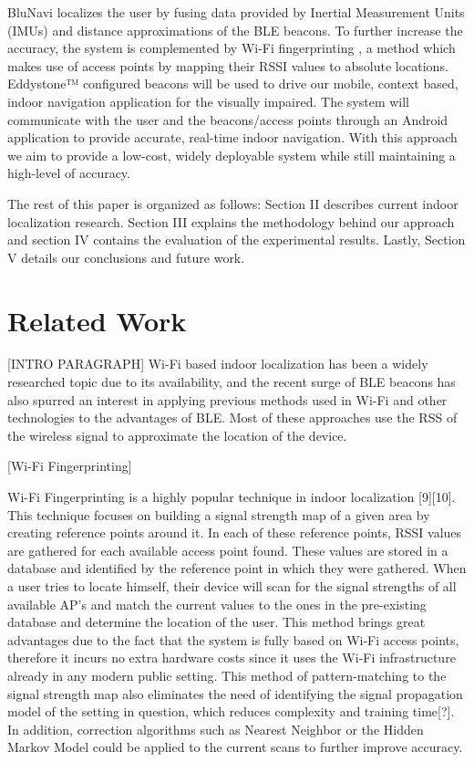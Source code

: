 \documentclass[conference]{IEEEtran}
\begin{document}
BluNavi localizes the user by fusing data provided by Inertial Measurement Units (IMUs) and distance approximations of the BLE beacons. To further increase the accuracy, the system is complemented by Wi-Fi fingerprinting , a method which makes use of access points by mapping their RSSI values to absolute locations. Eddystone™ configured beacons will be used to drive our mobile, context based, indoor navigation application for the visually impaired. The system will communicate with the user and the beacons/access points through an Android application to provide accurate, real-time indoor navigation. With this approach we aim to provide a low-cost, widely deployable system while still maintaining  a high-level of accuracy.

The rest of this paper is organized as follows: Section II describes current indoor localization research. Section III explains the methodology behind our approach and section IV contains the evaluation of the experimental results. Lastly, Section V details our conclusions and future work.

\section{Related Work}
[INTRO PARAGRAPH]
Wi-Fi based indoor localization has been a widely researched topic due to its availability, and the recent surge of BLE beacons has also spurred an interest in applying previous methods used in Wi-Fi and other technologies to the advantages of BLE. Most of these approaches use the RSS of the wireless signal to approximate the location of the device.

[Wi-Fi Fingerprinting]

Wi-Fi Fingerprinting is a highly popular technique in indoor localization [9][10]. This technique focuses on  building a signal strength map of a given area by creating reference points around it. In each of these reference points, RSSI values are gathered for each available access point found. These values are stored in a database and identified by the reference point in which they were gathered. When a user tries to locate himself, their device will scan for the signal strengths of all available AP’s and match the current values to the ones in the pre-existing database and determine the location of the user. This method brings great advantages due to the fact that the system is fully based on Wi-Fi access points, therefore it incurs no extra hardware costs since it uses the Wi-Fi infrastructure already in any modern public setting. This method of pattern-matching to the signal strength map also eliminates the need of identifying the signal propagation model of the setting in question, which reduces complexity and training time[?]. In addition, correction algorithms such as Nearest Neighbor or the Hidden Markov Model could be applied to the current scans to further improve accuracy.
\end{document}
